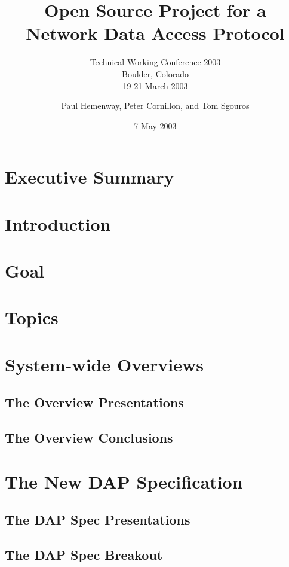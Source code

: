 \documentclass[12pt,titlepage]{dods-paper}
\title{Open Source Project for a\\Network Data Access Protocol}
\subtitle{Technical Working Conference 2003\\Boulder, Colorado
\\19-21 March 2003}
\author{Paul Hemenway, Peter Cornillon, and Tom Sgouros}
\date{7 May 2003}
\begin{document}
\maketitle


\section*{Executive Summary}

   

\newpage
\tableofcontents
\newpage

\section{Introduction}
   
\section{Goal}
   
\section{Topics}
   
\section{System-wide Overviews}
   \subsection{The Overview Presentations}
      
   \subsection{The Overview Conclusions}
      
\section{The New \acs{DAP} Specification}
   \subsection{The \ac{DAP} Spec Presentations}
       
   \subsection{The \ac{DAP} Spec Breakout}
       
\end{document}
